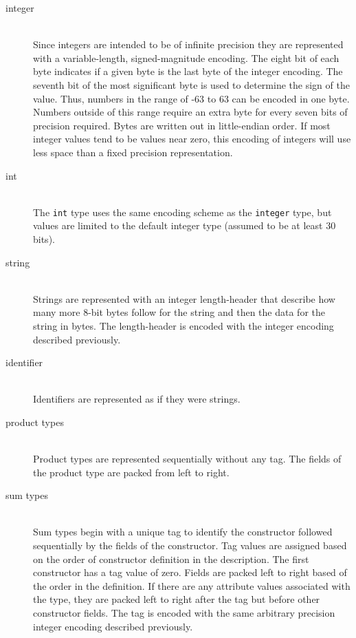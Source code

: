 \begin{description}
  \item[integer] \mbox{}\\
    Since \asdl{} integers are intended to be of infinite precision they are
    represented with a variable-length, signed-magnitude encoding.
    The eight bit of each byte indicates if a given byte is the last byte of
    the integer encoding.
    The seventh bit of the most significant byte is used to determine the
    sign of the value.
    Thus, numbers in the range of -63 to 63 can be encoded in one byte.
    Numbers outside of this range require an extra byte for every seven bits
    of precision required.
    Bytes are written out in little-endian order.
    If most integer values tend to be values near zero, this encoding of integers
    will use less space than a fixed precision representation.

  \item[int] \mbox{}\\
    The \lstinline!int! type uses the same encoding scheme as the \lstinline!integer!
    type, but values are limited to the default integer type (assumed to be at least
    30 bits).

  \item[string] \mbox{}\\
    Strings are represented with an integer length-header that describe how many more
    8-bit bytes follow for the string and then the data for the string in
    bytes.
    The length-header is encoded with the integer encoding described previously.

  \item[identifier] \mbox{}\\
    Identifiers are represented as if they were strings. 

  \item[product types] \mbox{}\\ 
    Product types are represented sequentially without any tag. The fields of
    the product type are packed from left to right.

  \item[sum types] \mbox{}\\
    Sum types begin with a unique tag to identify the constructor
    followed sequentially by the fields of the constructor.
    Tag values are assigned based on the order of constructor definition in the
    description.
    The first constructor has a tag value of zero.
    Fields are packed left to right based of the order in the definition.
    If there are any attribute values associated with the type, they are packed left to right
    after the tag but before other constructor fields.
    The tag is encoded with the same arbitrary precision integer encoding described previously.


\end{description}

